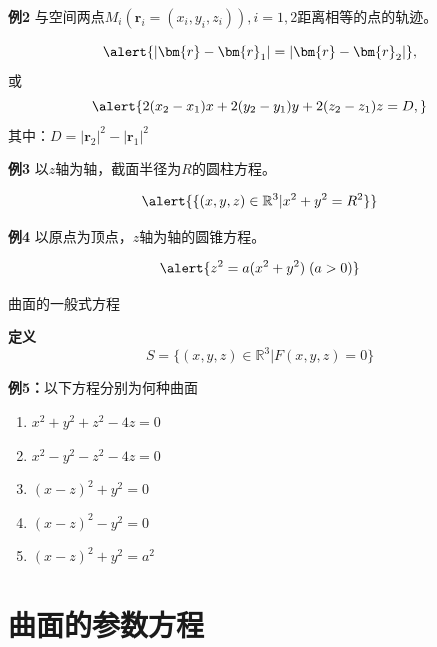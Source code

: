 \begin{frame}
	\linespread{1.2}
	\begin{exampleblock}{{\bf 例2}\hfill}
		与空间两点$M_i(\bm{r}_i=(x_i,y_i,z_i)),i=1,2$距离相等的点的轨迹。
	\end{exampleblock}\pause 
	$$\alert{|\bm{r}-\bm{r}_1|=|\bm{r}-\bm{r}_2|},$$\pause 
	或
	$$\alert{2(x_2-x_1)x+2(y_2-y_1)y+2(z_2-z_1)z=D,}$$
	其中：\alert{$D=|\bm{r}_2|^2-|\bm{r}_1|^2$}
\end{frame}

\begin{frame}
	\linespread{1.2}
	\begin{exampleblock}{{\bf 例3}\hfill}
		以$z$轴为轴，截面半径为$R$的圆柱方程。
	\end{exampleblock}\pause 
	$$\alert{\{(x,y,z)\in\mathbb{R}^3|x^2+y^2=R^2\}}$$\pause 
	\begin{exampleblock}{{\bf 例4}\hfill}
		以原点为顶点，$z$轴为轴的圆锥方程。
	\end{exampleblock}\pause 
	$$\alert{z^2=a(x^2+y^2)\;(a>0)}$$
\end{frame}

\begin{frame}{曲面的一般式方程}
	\linespread{1.2}\pause 
	\begin{block}{{\bf 定义}\hfill}
		$$S=\{(x,y,z)\in\mathbb{R}^3|F(x,y,z)=0\}$$
	\end{block}\pause 
	\begin{exampleblock}{{\bf 例5：}以下方程分别为何种曲面\hfill}\pause 
		\begin{enumerate}
		  \item $x^2+y^2+z^2-4z=0$\pause {}\pause 
		  \item $x^2-y^2-z^2-4z=0$\pause {}\pause 
		  \item $(x-z)^2+y^2=0$\pause {}\pause 
		  \item $(x-z)^2-y^2=0$\pause {}\pause 
		  \item $(x-z)^2+y^2=a^2$\pause {}
		\end{enumerate}
	\end{exampleblock}
\end{frame}

\section{曲面的参数方程}

